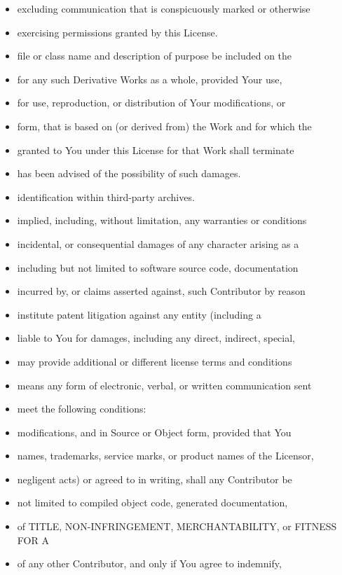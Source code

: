 \begin{itemize}
\item
  excluding communication that is conspicuously marked or otherwise
\item
  exercising permissions granted by this License.
\item
  file or class name and description of purpose be included on the
\item
  for any such Derivative Works as a whole, provided Your use,
\item
  for use, reproduction, or distribution of Your modifications, or
\item
  form, that is based on (or derived from) the Work and for which the
\item
  granted to You under this License for that Work shall terminate
\item
  has been advised of the possibility of such damages.
\item
  identification within third-party archives.
\item
  implied, including, without limitation, any warranties or conditions
\item
  incidental, or consequential damages of any character arising as a
\item
  including but not limited to software source code, documentation
\item
  incurred by, or claims asserted against, such Contributor by reason
\item
  institute patent litigation against any entity (including a
\item
  liable to You for damages, including any direct, indirect, special,
\item
  may provide additional or different license terms and conditions
\item
  means any form of electronic, verbal, or written communication sent
\item
  meet the following conditions:
\item
  modifications, and in Source or Object form, provided that You
\item
  names, trademarks, service marks, or product names of the Licensor,
\item
  negligent acts) or agreed to in writing, shall any Contributor be
\item
  not limited to compiled object code, generated documentation,
\item
  of TITLE, NON-INFRINGEMENT, MERCHANTABILITY, or FITNESS FOR A
\item
  of any other Contributor, and only if You agree to indemnify,

\end{itemize}
